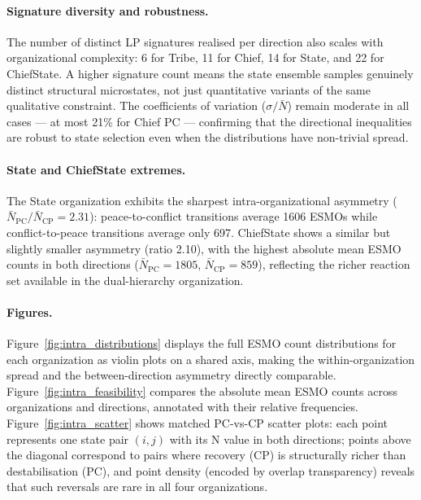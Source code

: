 \paragraph{Signature diversity and robustness.}
The number of distinct LP signatures realised per direction also scales with
organizational complexity: 6 for Tribe, 11 for Chief, 14 for State, and 22
for ChiefState.  A higher signature count means the state ensemble samples
genuinely distinct structural microstates, not just quantitative variants of
the same qualitative constraint.  The coefficients of variation
($\sigma / \bar{N}$) remain moderate in all cases --- at most 21\%
for Chief PC --- confirming that the directional inequalities are robust
to state selection even when the distributions have non-trivial spread.

\paragraph{State and ChiefState extremes.}
The State organization exhibits the sharpest intra-organizational asymmetry
($\bar{N}_{\text{PC}} / \bar{N}_{\text{CP}} = 2.31$): peace-to-conflict
transitions average 1606 ESMOs while conflict-to-peace transitions average
only 697.  ChiefState shows a similar but slightly smaller asymmetry (ratio
2.10), with the highest absolute mean ESMO counts in both directions
($\bar{N}_{\text{PC}} = 1805$, $\bar{N}_{\text{CP}} = 859$), reflecting
the richer reaction set available in the dual-hierarchy organization.

\paragraph{Figures.}
Figure~\ref{fig:intra_distributions} displays the full ESMO count
distributions for each organization as violin plots on a shared axis,
making the within-organization spread and the between-direction asymmetry
directly comparable.  Figure~\ref{fig:intra_feasibility} compares the
absolute mean ESMO counts across organizations and directions, annotated
with their relative frequencies.  Figure~\ref{fig:intra_scatter} shows
matched PC-vs-CP scatter plots: each point represents one state pair $(i,j)$
with its N value in both directions; points above the diagonal correspond to
pairs where recovery (CP) is structurally richer than destabilisation (PC),
and point density (encoded by overlap transparency) reveals that such
reversals are rare in all four organizations.

